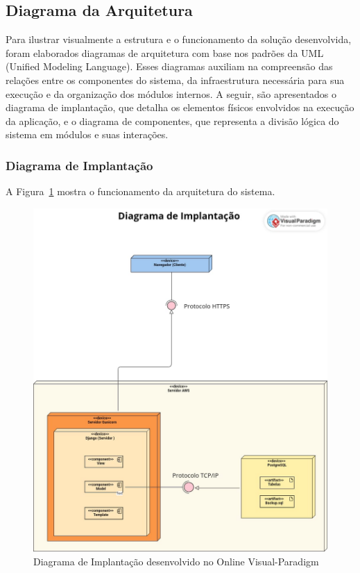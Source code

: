 \documentclass[
	12pt,				%
	openany,			%
	oneside,			%
	a4paper,			%
	english,			%
	french,				%
	spanish,			%
	brazil				%
	]{abntex2}
\begin{document}
\subsection{Diagrama da Arquitetura}
Para ilustrar visualmente a estrutura e o funcionamento da solução desenvolvida, foram elaborados diagramas de arquitetura com base nos padrões da UML (Unified Modeling Language). Esses diagramas auxiliam na compreensão das relações entre os componentes do sistema, da infraestrutura necessária para sua execução e da organização dos módulos internos.
A seguir, são apresentados o diagrama de implantação, que detalha os elementos físicos envolvidos na execução da aplicação, e o diagrama de componentes, que representa a divisão lógica do sistema em módulos e suas interações.
\subsubsection{Diagrama de Implantação}
A Figura~\ref{fig:diagramaimplantação} mostra o funcionamento da arquitetura do sistema.

\begin{figure}[H]
	\centering
	\includegraphics[width=\textwidth]{Diagrama de Implantação- Digitalização da Pousada.JPEG}
	\caption{Diagrama de Implantação desenvolvido no Online Visual-Paradigm}
	\label{fig:diagramaimplantação}
\end{figure}
\end{document}
